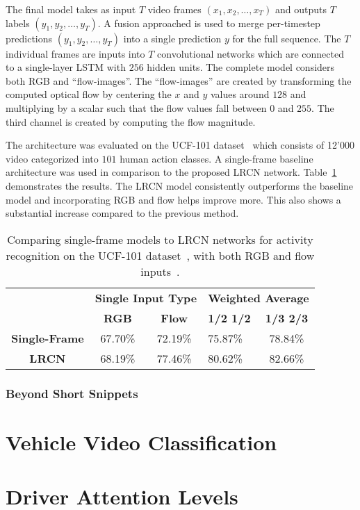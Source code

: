 The final model takes as input $T$ video frames $(x_1, x_2, \dots, x_T)$ and outputs $T$ labels $(y_1, y_2, \dots, y_T)$. A fusion approached is used to merge per-timestep predictions $(y_1, y_2, \dots, y_T)$ into a single prediction $y$ for the full sequence. The $T$ individual frames are inputs into $T$ convolutional networks which are connected to a single-layer LSTM with $256$ hidden units. The complete model considers both RGB and ``flow-images''. The ``flow-images'' are created by transforming the computed optical flow by centering the $x$ and $y$ values around $128$ and multiplying by a scalar such that the flow values fall between $0$ and $255$. The third channel is created by computing the flow magnitude.

The architecture was evaluated on the UCF-101 dataset~\cite{UCF-101} which consists of 12'000 video categorized into $101$ human action classes. A single-frame baseline architecture was used in comparison to the proposed LRCN network. Table~\ref{tab:lrcn} demonstrates the results. The LRCN model consistently outperforms the baseline model and incorporating RGB and flow helps improve more. This also shows a substantial increase compared to the previous method.

\begin{table}[ht]
  \centering
  \begin{tabular}{|l|c|c|l|c|}
    \hline
    \multirow{2}{*}{} & \multicolumn{2}{c|}{\textbf{Single Input Type}} & \multicolumn{2}{l|}{\textbf{Weighted Average}} \\ \cline{2-5} 
    & \textbf{RGB} & \textbf{Flow} & \textbf{1/2 1/2} & \textbf{1/3 2/3} \\ \hline
    \multicolumn{1}{|c|}{\textbf{Single-Frame}} & 67.70\% & 72.19\% & 75.87\% & 78.84\% \\ \hline
    \multicolumn{1}{|c|}{\textbf{LRCN}} & 68.19\% & 77.46\% & 80.62\% & 82.66\% \\ \hline
  \end{tabular}
  \caption{Comparing single-frame models to LRCN networks for activity recognition on the UCF-101 dataset~\cite{UCF-101}, with both RGB and flow inputs~\cite{LRCN:2015}.}
  \label{tab:lrcn}
\end{table}

\subsubsection{Beyond Short Snippets}


\section{Vehicle Video Classification}

\section{Driver Attention Levels}
